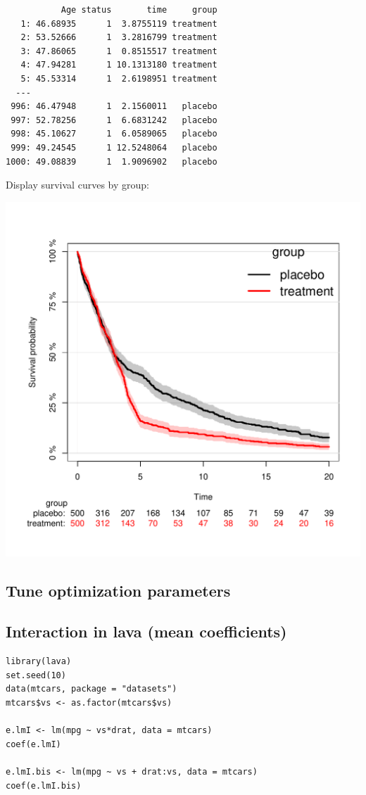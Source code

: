 \documentclass{article}
\begin{document}
\begin{verbatim}
           Age status       time     group
   1: 46.68935      1  3.8755119 treatment
   2: 53.52666      1  3.2816799 treatment
   3: 47.86065      1  0.8515517 treatment
   4: 47.94281      1 10.1313180 treatment
   5: 45.53314      1  2.6198951 treatment
  ---                                     
 996: 46.47948      1  2.1560011   placebo
 997: 52.78256      1  6.6831242   placebo
 998: 45.10627      1  6.0589065   placebo
 999: 49.24545      1 12.5248064   placebo
1000: 49.08839      1  1.9096902   placebo
\end{verbatim}

Display survival curves by group:
\begin{center}
\includegraphics[width=.9\linewidth]{./figures/fig-delayedTreatmentEffect.pdf}
\end{center}

\subsection{Tune optimization parameters}
\label{sec:org5e5a55f}
\subsection{Interaction in lava (mean coefficients)}
\label{sec:orgdf5955a}

\lstset{language=r,label= ,caption= ,captionpos=b,numbers=none}
\begin{lstlisting}
library(lava)
set.seed(10)
data(mtcars, package = "datasets")
mtcars$vs <- as.factor(mtcars$vs)

e.lmI <- lm(mpg ~ vs*drat, data = mtcars)
coef(e.lmI)

e.lmI.bis <- lm(mpg ~ vs + drat:vs, data = mtcars)
coef(e.lmI.bis)
\end{lstlisting}
\end{document}
